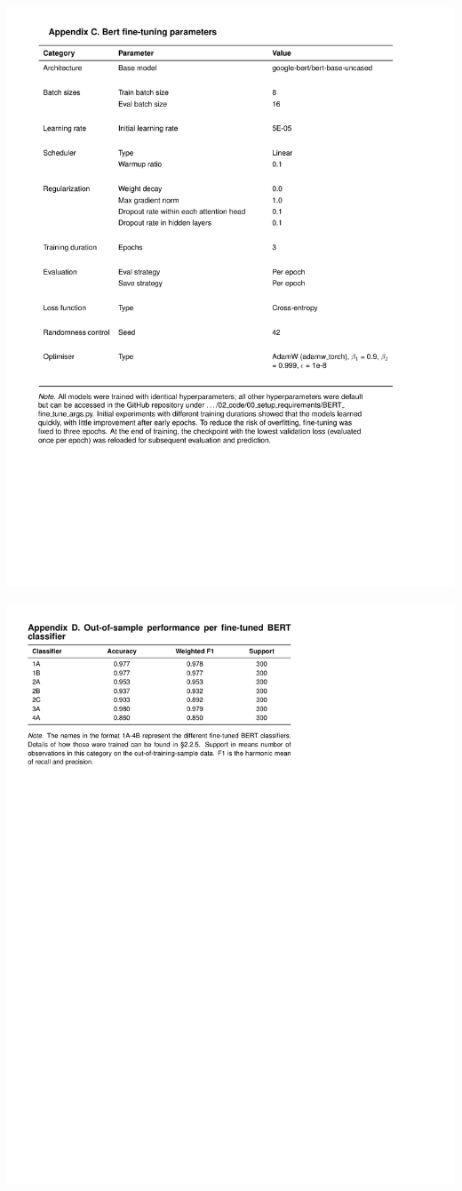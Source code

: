 \documentclass[
  12pt,
]{article}
\begin{document}
\includegraphics{../03_outputs/04_appendices/appendix_c.pdf}

\includegraphics{../03_outputs/04_appendices/appendix_d.pdf}
\end{document}
